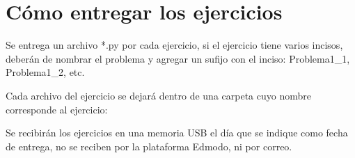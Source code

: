 \section*{Cómo entregar los ejercicios}
Se entrega un archivo *.py por cada ejercicio, si el ejercicio tiene varios incisos, deberán de nombrar el problema y agregar un sufijo con el inciso: Problema1\_1, Problema1\_2, etc.
\par
Cada archivo del ejercicio se dejará dentro de una carpeta cuyo nombre corresponde al ejercicio:
\par
{}
Se recibirán los ejercicios en una memoria USB el día que se indique como fecha de entrega, no se reciben por la plataforma Edmodo, ni por correo.	
